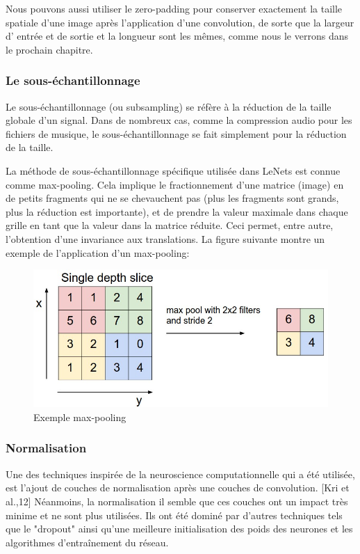 Nous pouvons aussi utiliser le zero-padding pour conserver exactement la taille spatiale d'une image après l'application d'une convolution, de sorte que la largeur d' entrée et de sortie et la longueur sont les mêmes, comme nous le verrons dans le prochain chapitre.


\subsubsection{Le sous-échantillonnage}
Le sous-échantillonnage (ou subsampling) se réfère à la réduction de la taille globale d'un signal. Dans de nombreux cas, comme la compression audio pour les fichiers de musique, le sous-échantillonnage se fait simplement pour la réduction de la taille. 

La méthode de sous-échantillonnage spécifique utilisée dans LeNets est connue comme max-pooling. Cela implique le fractionnement d'une matrice (image) en de petits fragments qui ne se chevauchent pas (plus les fragments sont grands, plus la réduction est importante), et de prendre la valeur maximale dans chaque grille en tant que la valeur dans la matrice réduite. 
Ceci permet, entre autre, l'obtention d'une invariance aux translations. La figure suivante montre un exemple de l'application d'un max-pooling:


\begin{figure}[H]
	\centering
		\includegraphics[width=5in]{Figures/maxpool.jpeg}
	\caption[MP]{Exemple max-pooling}
	\label{fig:Electron}
\end{figure}

\subsubsection{Normalisation}
Une des techniques inspirée de la neuroscience computationnelle qui a été utilisée, est l'ajout de couches de normalisation après une couches de convolution. [Kri et al.,12] Néanmoins, la normalisation il semble que ces couches ont un impact très minime et ne sont plus utilisées. Ils ont été dominé par d'autres techniques tels que le "dropout" ainsi qu'une meilleure initialisation des poids des neurones et les algorithmes d'entraînement du réseau.

